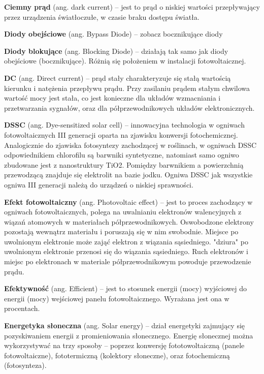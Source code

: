 \documentclass[12pt,a4paper]{article}
\begin{document}
\textbf{Ciemny prąd} (ang. dark current) – jest to prąd o niskiej wartości przepływający przez urządzenia światłoczułe, w czasie braku dostępu światła.


\textbf{Diody obejściowe} (ang. Bypass Diode) – zobacz bocznikujące diody

\textbf{Diody blokujące} (ang. Blocking Diode) – działają tak samo jak diody obejściowe (bocznikujące). Różnią się położeniem w instalacji fotowoltaicznej.

\textbf{DC} (ang. Direct current) – prąd stały charakteryzuje się stałą wartością kierunku i natężenia przepływu prądu. Przy zasilaniu prądem stałym chwilowa wartość mocy jest stała, co jest konieczne dla układów wzmacniania i przetwarzania sygnałów, oraz dla półprzewodnikowych układów elektronicznych.

\textbf{DSSC} (ang. Dye-sensitized solar cell) – innowacyjna technologia w ogniwach fotowoltaicznych III generacji oparta na zjawisku konwersji fotochemicznej. Analogicznie do zjawiska fotosyntezy zachodzącej w roślinach, w ogniwach DSSC odpowiednikiem chlorofilu są barwniki syntetyczne, natomiast samo ogniwo zbudowane jest z nanostruktury TiO2. Pomiędzy barwnikiem a powierzchnią przewodzącą znajduje się elektrolit na bazie jodku. Ogniwa DSSC jak wszystkie ogniwa III generacji należą do urządzeń o niskiej sprawności.

\textbf{Efekt fotowoltaiczny} (ang. Photovoltaic effect) – jest to proces zachodzący w ogniwach fotowoltaicznych, polega na uwalnianiu elektronów walencyjnych z wiązań atomowych w materiałach półprzewodnikowych. Oswobodzone elektrony pozostają wewnątrz materiału i poruszają się w nim swobodnie. Miejsce po uwolnionym elektronie może zająć elektron z wiązania sąsiedniego. "dziura" po uwolnionym elektronie przenosi się do wiązania sąsiedniego. Ruch elektronów i miejsc po elektronach w materiale półprzewodnikowym powoduje przewodzenie prądu.

\textbf{Efektywność} (ang. Efficient) – jest to stosunek energii (mocy) wyjściowej do energii (mocy) wejściowej panelu fotowoltaicznego. Wyrażana jest ona w procentach.

\textbf{Energetyka słoneczna} (ang. Solar energy) – dział energetyki zajmujący się pozyskiwaniem energii z promieniowania słonecznego. Energię słonecznej można wykorzystywać na trzy sposoby – poprzez konwersję fototowoltaiczną (panele fotowoltaiczne), fototermiczną (kolektory słoneczne), oraz fotochemiczną (fotosynteza).
\end{document}
